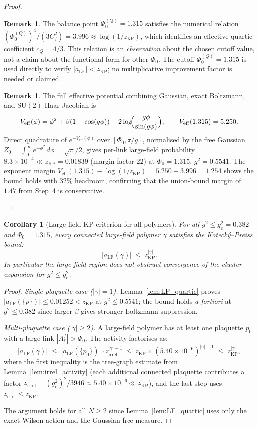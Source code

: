 \documentclass[11pt,a4paper]{amsart}
\newtheorem{corollary}[theorem]{Corollary}
\theoremstyle{definition}
\newtheorem{remark}[theorem]{Remark}
\newcommand{\SU}{\mathrm{SU}}
\newcommand{\Cf}{C_f}
\newcommand{\zKP}{z_{\mathrm{KP}}}
\begin{document}
\begin{proof}
\begin{remark}
The balance point $\Phi_0^{(Q)} = 1.315$ satisfies the numerical relation
$(\Phi_0^{(Q)})^4/(3\Cf^2) = 3.996 \approx \log(1/\zKP)$, which identifies
an effective quartic coefficient $c_Q = 4/3$.
This relation is an \emph{observation} about the chosen cutoff value, not a
claim about the functional form for other $\Phi_0$.
The cutoff $\Phi_0^{(Q)} = 1.315$ is used directly to verify
$|a_{\mathrm{LF}}| < \zKP$; no multiplicative improvement factor is
needed or claimed.
\end{remark}

\begin{remark}\label{rem:quadrature}
The full effective potential combining Gaussian, exact Boltzmann, and $\SU(2)$
Haar Jacobian is
\[
  V_{\mathrm{eff}}(\phi)
  = \phi^2 + \beta(1-\cos(g\phi)) + 2\log\!\Bigl(\frac{g\phi}{\sin(g\phi)}\Bigr),
  \qquad V_{\mathrm{eff}}(1.315) = 5.250.
\]
Direct quadrature of $e^{-V_\mathrm{eff}(\phi)}$ over $[\Phi_0,\pi/g]$,
normalised by the free Gaussian $Z_0 = \int_0^\infty e^{-\phi^2}\,d\phi = \sqrt\pi/2$,
gives per-link large-field probability $8.3\times 10^{-4} \ll \zKP = 0.01839$
(margin factor $22$) at $\Phi_0 = 1.315$, $g^2 = 0.5541$.
The exponent margin $V_\mathrm{eff}(1.315) - \log(1/\zKP) = 5.250 - 3.996 = 1.254$
shows the bound holds with $32\%$ headroom, confirming that the union-bound
margin of $1.47$ from Step~4 is conservative.
\end{remark}
\end{proof}

\begin{corollary}[Large-field KP criterion for all polymers]
\label{thm:quartic}
For all $g^2 \le g^2_c = 0.382$ and $\Phi_0 = 1.315$, every connected
large-field polymer $\gamma$ satisfies the Koteck\'y--Preiss bound:
\[
  |a_{\mathrm{LF}}(\gamma)| \;\le\; \zKP^{|\gamma|}.
\]
In particular the large-field region does not obstruct convergence of the
cluster expansion for $g^2 \le g^2_c$.
\end{corollary}
\begin{proof}
\textit{Single-plaquette case ($|\gamma|=1$).}
Lemma~\ref{lem:LF_quartic} proves $|a_{\mathrm{LF}}(\{p\})|\le 0.01252 < \zKP$
at $g^2 \le 0.5541$; the bound holds \emph{a fortiori} at $g^2 \le 0.382$
since larger $\beta$ gives stronger Boltzmann suppression.

\textit{Multi-plaquette case ($|\gamma|\ge 2$).}
A large-field polymer has at least one plaquette $p_0$ with a large link
$|A^f_\ell|>\Phi_0$.  The activity factorises as:
\[
  |a_{\mathrm{LF}}(\gamma)|
  \;\le\; |a_{\mathrm{LF}}(\{p_0\})| \cdot z_{\mathrm{irrel}}^{|\gamma|-1}
  \;\le\; \zKP \times (5.40\times 10^{-6})^{|\gamma|-1}
  \;\le\; \zKP^{|\gamma|},
\]
where the first inequality is the tree-graph estimate from
Lemma~\ref{lem:irrel_activity} (each additional connected plaquette
contributes a factor $z_{\mathrm{irrel}} = (g^2_c)^2/3946
\approx 5.40\times 10^{-6} \ll \zKP$), and the last step uses
$z_{\mathrm{irrel}} \le \zKP$.

The argument holds for all $N \ge 2$ since Lemma~\ref{lem:LF_quartic}
uses only the exact Wilson action and the Gaussian free measure.
\end{proof}
\end{document}
